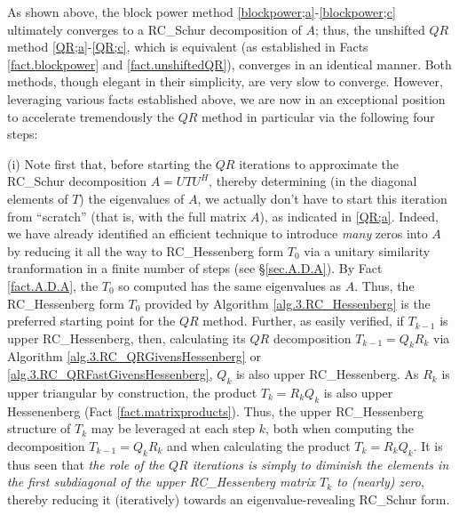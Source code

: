 
\noindent As shown above, the block power method \eqref{blockpower;a}-\eqref{blockpower;c} ultimately converges to a RC_Schur decomposition of $A$; thus, the unshifted
$QR$ method \eqref{QR;a}-\eqref{QR;c}, which is equivalent (as established in Facts \ref{fact.blockpower} and \ref{fact.unshiftedQR}), converges in an identical manner.
Both methods, though elegant in their simplicity, are very slow to converge.
However, leveraging various facts established above, we are now in an exceptional position to accelerate tremendously the $QR$ method in particular via the following
four steps:\vskip0.1in

\noindent (i)
Note first that, before starting the $QR$ iterations to approximate the RC_Schur decomposition $A=UTU^H$, thereby determining (in the diagonal elements of $T$)
the eigenvalues of $A$, we actually don't have to start this iteration from ``scratch'' (that is, with the full matrix $A$), as indicated in
\eqref{QR;a}.  Indeed, we have already identified an efficient technique to introduce {\it many} zeros into $A$ by reducing it all the way
to RC_Hessenberg form $T_0$ via a unitary similarity tranformation in a finite number of steps (see \S \ref{sec.A.D.A}).
By Fact \ref{fact.A.D.A}, the $T_0$ so computed has the same eigenvalues as $A$.
Thus, {the RC_Hessenberg form $T_0$ provided by Algorithm \ref{alg.3.RC_Hessenberg} is the preferred starting point for the $QR$ method.}
Further, as easily verified, if $T_{k-1}$ is upper RC_Hessenberg, then, calculating its $QR$ decomposition $T_{k-1}={Q}_{k} {R}_{k}$
via Algorithm \ref{alg.3.RC_QRGivensHessenberg} or \ref{alg.3.RC_QRFastGivensHessenberg},
${Q}_{k}$ is also upper RC_Hessenberg.  As ${R}_{k}$ is upper triangular by construction, the product $T_{k} = {R}_{k} {Q}_{k}$
is also upper Hessenenberg (Fact \ref{fact.matrixproducts}).  Thus, the upper RC_Hessenberg structure of $T_{k}$ may be leveraged at each step $k$, both when computing the
decomposition $T_{k-1}={Q}_{k} {R}_{k}$ and when calculating the product $T_{k} = {R}_{k} {Q}_{k}$.  It is thus seen that
{\it the role of the $QR$ iterations is simply to diminish the elements in the first subdiagonal of the upper RC_Hessenberg matrix $T_{k}$ to (nearly) zero},
thereby reducing it (iteratively) towards an eigenvalue-revealing RC_Schur form.\vskip0.1in

